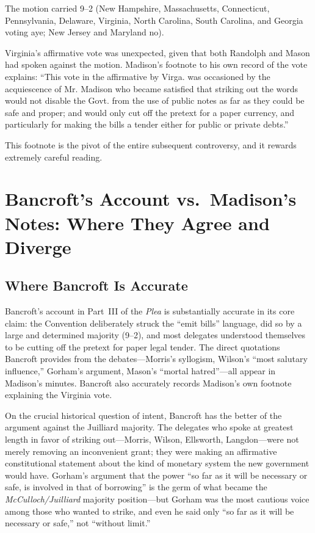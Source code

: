 \documentclass[12pt]{article}
\begin{document}
The motion carried 9--2 (New Hampshire, Massachusetts, Connecticut,
Pennsylvania, Delaware, Virginia, North Carolina, South Carolina,
and Georgia voting aye; New Jersey and Maryland no).

Virginia's affirmative vote was unexpected, given that both Randolph
and Mason had spoken against the motion. Madison's footnote to his
own record of the vote explains: ``This vote in the affirmative by
Virga. was occasioned by the acquiescence of Mr. Madison who became
satisfied that striking out the words would not disable the Govt.
from the use of public notes as far as they could be safe and proper;
and would only cut off the pretext for a paper currency, and
particularly for making the bills a tender either for public or
private debts.''

This footnote is the pivot of the entire subsequent controversy, and it
rewards extremely careful reading.

\section{Bancroft's Account vs.\ Madison's Notes: Where They Agree
and Diverge}

\subsection{Where Bancroft Is Accurate}

Bancroft's account in Part~III of the \textit{Plea} is substantially
accurate in its core claim: the Convention deliberately struck the
``emit bills'' language, did so by a large and determined majority
(9--2), and most delegates understood themselves to be cutting off the
pretext for paper legal tender. The direct quotations Bancroft provides
from the debates---Morris's syllogism, Wilson's ``most salutary
influence,'' Gorham's argument, Mason's ``mortal hatred''---all
appear in Madison's minutes. Bancroft also accurately records
Madison's own footnote explaining the Virginia vote.

On the crucial historical question of intent, Bancroft has the better
of the argument against the Juilliard majority. The delegates who
spoke at greatest length in favor of striking out---Morris, Wilson,
Ellsworth, Langdon---were not merely removing an inconvenient grant;
they were making an affirmative constitutional statement about the
kind of monetary system the new government would have. Gorham's
argument that the power ``so far as it will be necessary or safe, is
involved in that of borrowing'' is the germ of what became the
\textit{McCulloch/Juilliard} majority position---but Gorham was the
most cautious voice among those who wanted to strike, and even he
said only ``so far as it will be necessary or safe,'' not ``without
limit.''
\end{document}
